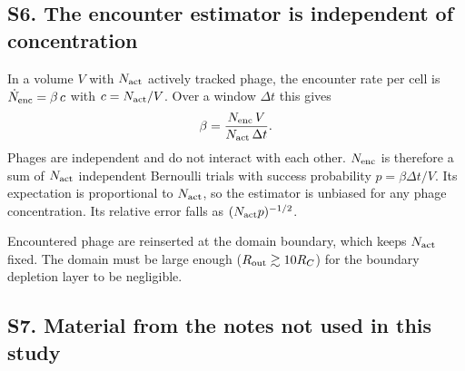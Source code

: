 
\subsection*{S6. The encounter estimator is independent of concentration}
In a volume $V$ with $N_{\rm act}$ actively tracked phage, the encounter rate per cell is $\dot N_{\rm enc}=\beta\,c$ with $c=N_{\rm act}/V$. Over a window $\Delta t$ this gives
\begin{equation}
\beta=\frac{N_{\rm enc}\,V}{N_{\rm act}\,\Delta t}.
\end{equation}
Phages are independent and do not interact with each other. $N_{\rm enc}$ is therefore a sum of $N_{\rm act}$ independent Bernoulli trials with success probability $p=\beta\Delta t/V$. Its expectation is proportional to $N_{\rm act}$, so the estimator is unbiased for any phage concentration. Its relative error falls as $(N_{\rm act}p)^{-1/2}$.

Encountered phage are reinserted at the domain boundary, which keeps $N_{\rm act}$ fixed. The domain must be large enough ($R_{\rm out}\gtrsim 10R_C$) for the boundary depletion layer to be negligible. 

\subsection*{S7. Material from the notes not used in this study}

